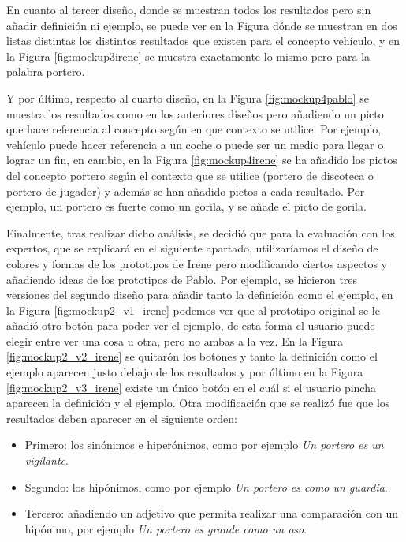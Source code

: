 En cuanto al tercer diseño, donde se muestran todos los resultados pero sin añadir definición ni ejemplo, se puede ver en la Figura  dónde se muestran en dos listas distintas los distintos resultados que existen para el concepto vehículo, y en la Figura \ref{fig:mockup3irene} se muestra exactamente lo mismo pero para la palabra portero. 

Y por último, respecto al cuarto diseño, en la Figura \ref{fig:mockup4pablo} se muestra los resultados como en los anteriores diseños pero añadiendo un picto que hace referencia al concepto según en que contexto se utilice. Por ejemplo, vehículo puede hacer referencia a un coche o puede ser un medio para llegar o lograr un fin, en cambio, en la Figura \ref{fig:mockup4irene} se ha añadido los pictos del concepto portero según el contexto que se utilice (portero de discoteca o portero de jugador) y además se han añadido pictos a cada resultado. Por ejemplo, un portero es fuerte como un gorila, y se añade el picto de gorila.

Finalmente, tras realizar dicho análisis, se decidió que para la evaluación con los expertos, que se explicará en el siguiente apartado, utilizaríamos el diseño de colores y formas de los prototipos de Irene pero modificando ciertos aspectos y añadiendo ideas de los prototipos de Pablo. Por ejemplo, se hicieron tres versiones del segundo diseño para añadir tanto la definición como el ejemplo, en la Figura \ref{fig:mockup2_v1_irene} podemos ver que al prototipo original se le añadió otro botón para poder ver el ejemplo, de esta forma el usuario puede elegir entre ver una cosa u otra, pero no ambas a la vez. En la Figura \ref{fig:mockup2_v2_irene} se quitarón los botones y tanto la definición como el ejemplo aparecen justo debajo de los resultados y por último en la Figura \ref{fig:mockup2_v3_irene} existe un único botón en el cuál si el usuario pincha aparecen la definición y el ejemplo.
Otra modificación que se realizó fue que los resultados deben aparecer en el siguiente orden:

\begin{itemize} 
	\item Primero: los sinónimos e hiperónimos, como por ejemplo \textit{Un portero es un vigilante}.
	\item Segundo: los hipónimos, como por ejemplo \textit{Un portero es como un guardia}.
	\item Tercero: añadiendo un adjetivo que permita realizar una comparación con un hipónimo, por ejemplo \textit{Un portero es grande como un oso}.
\end{itemize}

